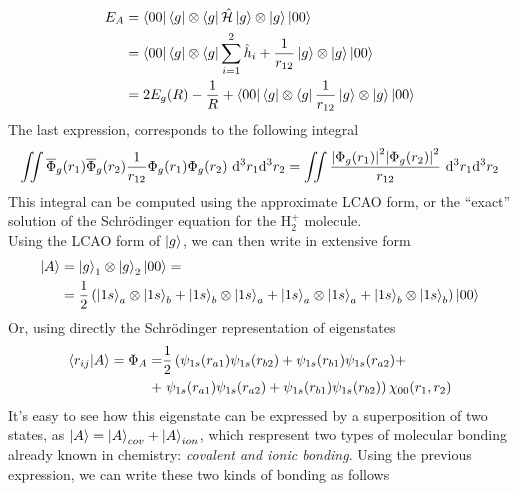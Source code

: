 \documentclass[../qm.tex]{subfiles}
\begin{document}
	\begin{equation}
		\begin{aligned}
			E_A&=\bra{00}\bra{g}\otimes\bra{g}\opr{\ham}\ket{g}\otimes\ket{g}\ket{00}\\
			&=\bra{00}\bra{g}\otimes\bra{g}\sum_{i=1}^2\opr{h}_i+\frac{1}{r_{12}}\ket{g}\otimes\ket{g}\ket{00}\\
			&=2E_g(R)-\frac{1}{R}+\bra{00}\bra{g}\otimes\bra{g}\frac{1}{r_{12}}\ket{g}\otimes\ket{g}\ket{00}
		\end{aligned}
		\label{eq:rayleighritzh2}
	\end{equation}
	The last expression, corresponds to the following integral
	\begin{equation*}
		\iint\cc{\Phi}_g(r_1)\cc{\Phi}_g(r_2)\frac{1}{r_{12}}\Phi_g(r_1)\Phi_g(r_2)\ddiff[3]{r_1}{r_2}=\iint\frac{\abs{\Phi_g(r_1)}^2\abs{\Phi_g(r_2)}^2}{r_{12}}\ddiff[3]{r_1}{r_2}
	\end{equation*}
	This integral can be computed using the approximate LCAO form, or the ``exact'' solution of the Schrödinger equation for the $\mathrm{H}_2^+$ molecule.\\
	Using the LCAO form of $\ket{g}$, we can then write in extensive form
	\begin{equation}
		\begin{aligned}
			\ket{A}&=\ket{g}_1\otimes\ket{g}_2\ket{00}=\\
			&=\frac{1}{2}\left( \ket{1s}_a\otimes\ket{1s}_b+\ket{1s}_b\otimes\ket{1s}_a+\ket{1s}_a\otimes\ket{1s}_a+\ket{1s}_b\otimes\ket{1s}_b \right)\ket{00}
		\end{aligned}
		\label{eq:eigenfunctionAh2}
	\end{equation}
	Or, using directly the Schrödinger representation of eigenstates
	\begin{equation}
		\begin{aligned}
			\bra{r_{ij}}\ket{A}=\Phi_A=&\frac{1}{2}\left( \psi_{1s}(r_{a1})\psi_{1s}(r_{b2})+\psi_{1s}(r_{b1})\psi_{1s}(r_{a2})+\right.\\
			+&\left.\psi_{1s}(r_{a1})\psi_{1s}(r_{a2})+\psi_{1s}(r_{b1})\psi_{1s}(r_{b2}) \right)\chi_{00}(r_1,r_2)
		\end{aligned}
		\label{eq:eigenfunctonAh2schr}
	\end{equation}
	It's easy to see how this eigenstate can be expressed by a superposition of two states, as $\ket{A}=\ket{A}_{cov}+\ket{A}_{ion}$, which respresent two types of molecular bonding already known in chemistry: \textit{covalent and ionic bonding}. Using the previous expression, we can write these two kinds of bonding as follows
\end{document}
